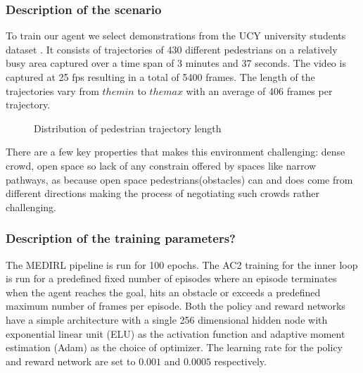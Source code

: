 \subsubsection*{Description of the scenario}
To train our agent we select demonstrations from the UCY university students dataset \cite{ucy-dataset-university-students}. It consists of trajectories of 430 different pedestrians on a relatively busy area captured over a time span of 3 minutes and 37 seconds. The video is captured at 25 fps resulting in a total of 5400 frames. The length of the trajectories vary from $the min$  to $the max$ with an average of 406 frames per trajectory. 
\begin{figure}
	\caption {Distribution of pedestrian trajectory length}
\end{figure}
There are a few key properties that makes this environment challenging: dense crowd, open space so lack of any constrain offered by spaces like narrow pathways, as because open space pedestrians(obstacles) can and does come from different directions making the process of negotiating such crowds rather challenging. 

%			
\subsubsection*{Description of the training parameters?}

The MEDIRL pipeline is run for 100 epochs. The AC2 \cite{ac2} training for the inner loop is run for a predefined fixed number of episodes where an episode terminates when the agent reaches the goal, hits an obstacle or exceeds a predefined maximum number of frames per episode. Both the policy and reward networks have a simple architecture with a single 256 dimensional hidden node with exponential linear unit (ELU) \cite{exponential-linear-unit} as the activation function and adaptive moment estimation (Adam) \cite{adaptive-moment-estimation} as the choice of optimizer. The learning rate for the policy and reward network are set to $0.001$ and $0.0005$ respectively.


